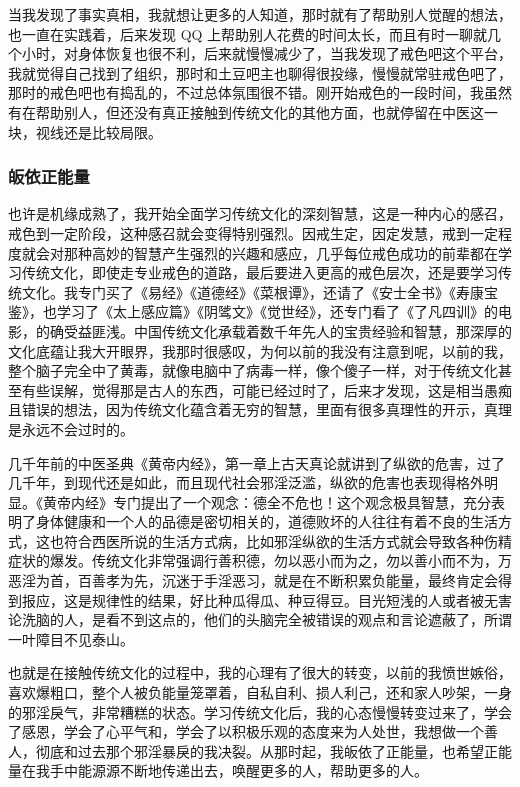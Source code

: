 当我发现了事实真相，我就想让更多的人知道，那时就有了帮助别人觉醒的想法，也一直在实践着，后来发现 QQ 上帮助别人花费的时间太长，而且有时一聊就几个小时，对身体恢复也很不利，后来就慢慢减少了，当我发现了戒色吧这个平台，我就觉得自己找到了组织，那时和土豆吧主也聊得很投缘，慢慢就常驻戒色吧了，那时的戒色吧也有捣乱的，不过总体氛围很不错。刚开始戒色的一段时间，我虽然有在帮助别人，但还没有真正接触到传统文化的其他方面，也就停留在中医这一块，视线还是比较局限。

\subsubsection{皈依正能量}

也许是机缘成熟了，我开始全面学习传统文化的深刻智慧，这是一种内心的感召，戒色到一定阶段，这种感召就会变得特别强烈。因戒生定，因定发慧，戒到一定程度就会对那种高妙的智慧产生强烈的兴趣和感应，几乎每位戒色成功的前辈都在学习传统文化，即使走专业戒色的道路，最后要进入更高的戒色层次，还是要学习传统文化。我专门买了《易经》《道德经》《菜根谭》，还请了《安士全书》《寿康宝鉴》，也学习了《太上感应篇》《阴骘文》《觉世经》，还专门看了《了凡四训》的电影，的确受益匪浅。中国传统文化承载着数千年先人的宝贵经验和智慧，那深厚的文化底蕴让我大开眼界，我那时很感叹，为何以前的我没有注意到呢，以前的我，整个脑子完全中了黄毒，就像电脑中了病毒一样，像个傻子一样，对于传统文化甚至有些误解，觉得那是古人的东西，可能已经过时了，后来才发现，这是相当愚痴且错误的想法，因为传统文化蕴含着无穷的智慧，里面有很多真理性的开示，真理是永远不会过时的。

几千年前的中医圣典《黄帝内经》，第一章上古天真论就讲到了纵欲的危害，过了几千年，到现代还是如此，而且现代社会邪淫泛滥，纵欲的危害也表现得格外明显。《黄帝内经》专门提出了一个观念：德全不危也！这个观念极具智慧，充分表明了身体健康和一个人的品德是密切相关的，道德败坏的人往往有着不良的生活方式，这也符合西医所说的生活方式病，比如邪淫纵欲的生活方式就会导致各种伤精症状的爆发。传统文化非常强调行善积德，勿以恶小而为之，勿以善小而不为，万恶淫为首，百善孝为先，沉迷于手淫恶习，就是在不断积累负能量，最终肯定会得到报应，这是规律性的结果，好比种瓜得瓜、种豆得豆。目光短浅的人或者被无害论洗脑的人，是看不到这点的，他们的头脑完全被错误的观点和言论遮蔽了，所谓一叶障目不见泰山。

也就是在接触传统文化的过程中，我的心理有了很大的转变，以前的我愤世嫉俗，喜欢爆粗口，整个人被负能量笼罩着，自私自利、损人利己，还和家人吵架，一身的邪淫戾气，非常糟糕的状态。学习传统文化后，我的心态慢慢转变过来了，学会了感恩，学会了心平气和，学会了以积极乐观的态度来为人处世，我想做一个善人，彻底和过去那个邪淫暴戾的我决裂。从那时起，我皈依了正能量，也希望正能量在我手中能源源不断地传递出去，唤醒更多的人，帮助更多的人。

